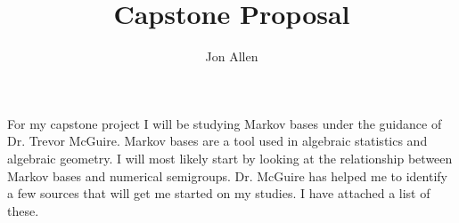 \documentclass[11pt]{amsart}
\begin{document}
\author{Jon Allen}
\title{Capstone Proposal}
\maketitle
For my capstone project I will be studying Markov bases under the guidance of Dr. Trevor McGuire. Markov bases are a tool used in algebraic statistics and algebraic geometry. I will most likely start by looking at the relationship between Markov bases and numerical semigroups. Dr. McGuire has helped me to identify a few sources that will get me started on my studies. I have attached a list of these.
\nocite{*}


\end{document}
